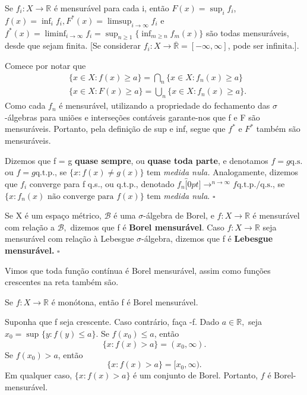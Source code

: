 \documentclass[MeasureTheory/measure_theory.tex]{subfiles}
\begin{document}
\begin{prop*}
	Se \(f_{i}:X\rightarrow \mathbb{R} \) é mensurável para cada i, então \(F(x) = \sup_{i}f_{i}\), \(f(x) = \inf_{i}f_{i}, F^{*}(x) = \limsup_{i\to \infty}f_{i}\)
	e \(f^{*}(x) = \liminf_{i\to \infty}f_{i} = \sup_{n\geq 1}\{\inf_{m\geq n}f_{m}(x)\}\) são todas mensuráveis, desde que sejam finita. [Se considerar \(f_{i}:X\rightarrow \overline{\mathbb{R}}=[-\infty, \infty]\), pode
	ser infinita.].
\end{prop*}
\begin{proof*}
	Comece por notar que
	\begin{align*}
		 & \{x\in X: f(x) \geq a\} = \bigcap_{n}^{}\{x\in X: f_{n}(x) \geq a\}  \\
		 & \{x\in X: F(x) \geq a\} = \bigcup_{n}^{}\{x\in X: f_{n}(x) \geq a\}.
	\end{align*}
	Como cada \(f_{n}\) é mensurável, utilizando a propriedade do fechamento das \(\sigma \)-álgebras para uniões e interseções contáveis garante-nos que f e F são mensuráveis. Portanto, pela definição de
	sup e inf, segue que \(f^{*}\) e \(F^{*}\) também são mensuráveis.
\end{proof*}
\begin{def*}
	Dizemos que f = g \textbf{quase sempre}, ou \textbf{quase toda parte}, e denotamos \(f= g \mathrm{q.s.}\) ou \(f = g \mathrm{q.t.p.}\), se \(\{x: f(x)\neq g(x)\}\) tem \textit{medida nula.} Analogamente, dizemos que
	\(f_{i}\) converge para f q.s., ou q.t.p., denotado \(f_{n}\overbracket[0pt]{\longrightarrow}^{n\to \infty}f \mathrm{q.t.p.}/\mathrm{q.s.}\), se \(\{x: f_{n}(x) \text{ não converge para }f(x)\}\) tem \textit{medida nula}. \(\square\)
\end{def*}
\begin{def*}
	Se X é um espaço métrico, \(\mathcal{B}\) é uma \(\sigma \)-álgebra de Borel, e \(f:X\rightarrow \mathbb{R}\) é mensurável com relação a \(\mathcal{B},\) dizemos que f é \textbf{Borel mensurável}. Caso \(f:X\rightarrow \mathbb{R}\) seja
	mensurável com relação à Lebesgue \(\sigma \)-álgebra, dizemos que f é \textbf{Lebesgue mensurável.} \(\square\)
\end{def*}
Vimos que toda função contínua é Borel mensurável, assim como funções crescentes na reta também são.
\begin{prop*}
	Se \(f:X\rightarrow \mathbb{R}\) é monótona, então f é Borel mensurável.
\end{prop*}
\begin{proof*}
	Suponha que f seja crescente. Caso contrário, faça -f. Dado \(a\in \mathbb{R},\) seja \(x_{0}=\sup_{}\{y:f(y) \leq a\}.\) Se \(f(x_{0}) \leq a\), então
	\[
		\{x: f(x) > a\} = (x_{0}, \infty).
	\]
	Se \(f(x_{0}) > a\), então
	\[
		\{x:f(x) > a\}  = [x_{0}, \infty).
	\]
	Em qualquer caso, \(\{x: f(x) > a\}\) é um conjunto de Borel. Portanto, \(f\) é Borel-mensurável. \qedsymbol
\end{proof*}
\end{document}
